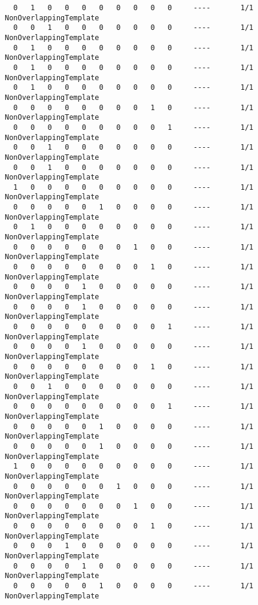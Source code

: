 \begin{code}
\begin{verbatim}
  0   1   0   0   0   0   0   0   0   0     ----       1/1       NonOverlappingTemplate
  0   0   1   0   0   0   0   0   0   0     ----       1/1       NonOverlappingTemplate
  0   1   0   0   0   0   0   0   0   0     ----       1/1       NonOverlappingTemplate
  0   1   0   0   0   0   0   0   0   0     ----       1/1       NonOverlappingTemplate
  0   1   0   0   0   0   0   0   0   0     ----       1/1       NonOverlappingTemplate
  0   0   0   0   0   0   0   0   1   0     ----       1/1       NonOverlappingTemplate
  0   0   0   0   0   0   0   0   0   1     ----       1/1       NonOverlappingTemplate
  0   0   1   0   0   0   0   0   0   0     ----       1/1       NonOverlappingTemplate
  0   0   1   0   0   0   0   0   0   0     ----       1/1       NonOverlappingTemplate
  1   0   0   0   0   0   0   0   0   0     ----       1/1       NonOverlappingTemplate
  0   0   0   0   0   1   0   0   0   0     ----       1/1       NonOverlappingTemplate
  0   1   0   0   0   0   0   0   0   0     ----       1/1       NonOverlappingTemplate
  0   0   0   0   0   0   0   1   0   0     ----       1/1       NonOverlappingTemplate
  0   0   0   0   0   0   0   0   1   0     ----       1/1       NonOverlappingTemplate
  0   0   0   0   1   0   0   0   0   0     ----       1/1       NonOverlappingTemplate
  0   0   0   0   1   0   0   0   0   0     ----       1/1       NonOverlappingTemplate
  0   0   0   0   0   0   0   0   0   1     ----       1/1       NonOverlappingTemplate
  0   0   0   0   1   0   0   0   0   0     ----       1/1       NonOverlappingTemplate
  0   0   0   0   0   0   0   0   1   0     ----       1/1       NonOverlappingTemplate
  0   0   1   0   0   0   0   0   0   0     ----       1/1       NonOverlappingTemplate
  0   0   0   0   0   0   0   0   0   1     ----       1/1       NonOverlappingTemplate
  0   0   0   0   0   1   0   0   0   0     ----       1/1       NonOverlappingTemplate
  0   0   0   0   0   1   0   0   0   0     ----       1/1       NonOverlappingTemplate
  1   0   0   0   0   0   0   0   0   0     ----       1/1       NonOverlappingTemplate
  0   0   0   0   0   0   1   0   0   0     ----       1/1       NonOverlappingTemplate
  0   0   0   0   0   0   0   1   0   0     ----       1/1       NonOverlappingTemplate
  0   0   0   0   0   0   0   0   1   0     ----       1/1       NonOverlappingTemplate
  0   0   0   1   0   0   0   0   0   0     ----       1/1       NonOverlappingTemplate
  0   0   0   0   1   0   0   0   0   0     ----       1/1       NonOverlappingTemplate
  0   0   0   0   0   1   0   0   0   0     ----       1/1       NonOverlappingTemplate

\end{verbatim}
\end{code}
